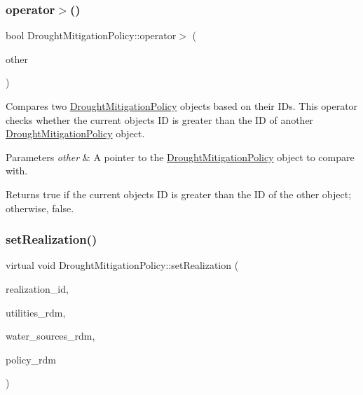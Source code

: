 \subsubsection{\texorpdfstring{operator$>$()}{operator>()}}
{\footnotesize\ttfamily bool Drought\+Mitigation\+Policy\+::operator$>$ (\begin{DoxyParamCaption}\item[{const \mbox{\hyperlink{classDroughtMitigationPolicy}{Drought\+Mitigation\+Policy}} $\ast$}]{other }\end{DoxyParamCaption})}



Compares two \mbox{\hyperlink{classDroughtMitigationPolicy}{Drought\+Mitigation\+Policy}} objects based on their I\+Ds. This operator checks whether the current object\textquotesingle{}s ID is greater than the ID of another \mbox{\hyperlink{classDroughtMitigationPolicy}{Drought\+Mitigation\+Policy}} object. 


\begin{DoxyParams}{Parameters}
{\em other} & A pointer to the \mbox{\hyperlink{classDroughtMitigationPolicy}{Drought\+Mitigation\+Policy}} object to compare with.\\
\hline
\end{DoxyParams}
\begin{DoxyReturn}{Returns}
{\ttfamily true} if the current object\textquotesingle{}s ID is greater than the ID of the other object; otherwise, {\ttfamily false}. 
\end{DoxyReturn}
\mbox{\label{classDroughtMitigationPolicy_a5d2033543cacca1e412eebef5106eab4}} 
\subsubsection{\texorpdfstring{set\+Realization()}{setRealization()}}
{\footnotesize\ttfamily virtual void Drought\+Mitigation\+Policy\+::set\+Realization (\begin{DoxyParamCaption}\item[{unsigned long}]{realization\+\_\+id,  }\item[{vector$<$ double $>$ \&}]{utilities\+\_\+rdm,  }\item[{vector$<$ double $>$ \&}]{water\+\_\+sources\+\_\+rdm,  }\item[{vector$<$ double $>$ \&}]{policy\+\_\+rdm }\end{DoxyParamCaption})\hspace{0.3cm}{\ttfamily [pure virtual]}}



